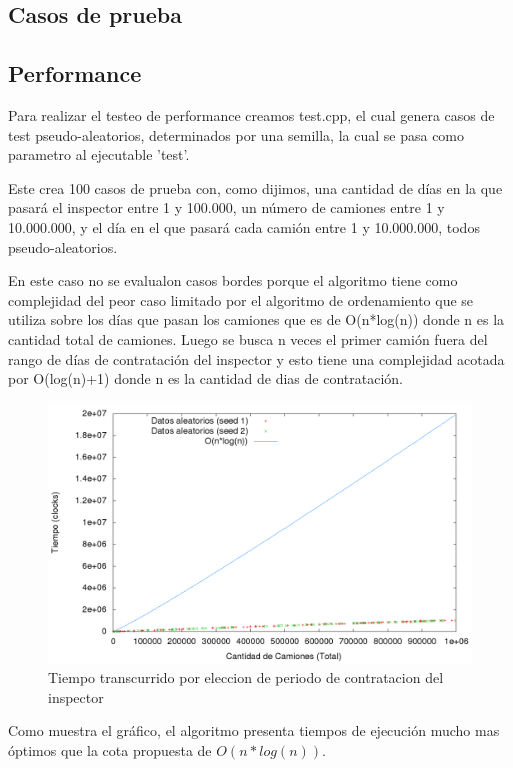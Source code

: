 \subsection{Casos de prueba}

\subsection{Performance}

Para realizar el testeo de performance creamos test.cpp, el cual genera casos de test pseudo-aleatorios, determinados por una semilla, la cual se pasa como parametro al ejecutable 'test'. 

Este crea 100 casos de prueba con, como dijimos, una cantidad de d\'ias en la que pasar\'a el inspector entre 1 y 100.000, un n\'umero de camiones entre 1 y 10.000.000, y el d\'ia en el que pasar\'a cada cami\'on entre 1 y 10.000.000, todos pseudo-aleatorios.

En este caso no se evalualon casos bordes porque el algoritmo tiene como complejidad del peor caso limitado por el algoritmo de ordenamiento que se utiliza sobre los d\'ias que pasan los camiones que es de O(n*log(n)) donde n es la cantidad total de camiones.
Luego se busca n veces el primer cami\'on fuera del rango de d\'ias de contrataci\'on del inspector y esto tiene una complejidad acotada por O(log(n)+1) donde n es la cantidad de dias de contrataci\'on.

\begin{center}
\begin{figure}[h!]
\includegraphics[scale=0.4]{./img/ej1_chart.png}
\caption{Tiempo transcurrido por eleccion de periodo de contratacion del inspector}
\end{figure}
\end{center}

Como muestra el gr\'afico, el algoritmo presenta tiempos de ejecuci\'on mucho mas \'optimos que la cota propuesta de $O(n*log(n))$.
